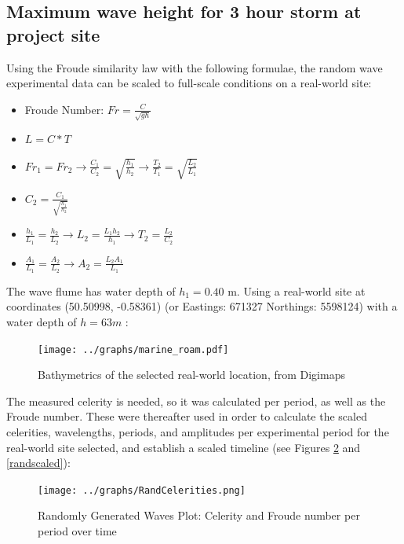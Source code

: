 \documentclass{article}
\begin{document}
	\subsection{Maximum wave height for 3 hour storm at project site}
	Using the Froude similarity law with the following formulae, the random wave experimental data can be scaled to full-scale conditions on a real-world site:
	\begin{itemize}
		\item Froude Number: $Fr = \frac{C}{\sqrt{gh}}$
		\item $L = C * T$
		\item $Fr_1 = Fr_2 \to \frac{C_1}{C_2} = \sqrt{\frac{h_1}{h_2}}\to \frac{T_2}{T_1} = \sqrt{\frac{L_2}{L_1}}$
		\item $C_2 = \frac{C_1}{\sqrt{\frac{h_1}{h_2}}}$
		\item $\frac{h_1}{L_1} = \frac{h_2}{L_2} \to L_2 = \frac{L_1 h_2}{h_1} \to T_2 = \frac{L_2}{C_2}$
		\item $\frac{A_1}{L_1} = \frac{A_2}{L_2} \to A_2 = \frac{L_2 A_1}{L_1}$
	\end{itemize}
	The wave flume has water depth of $h_1 = 0.40$ m. Using a real-world site at coordinates (50.50998, -0.58361) (or Eastings: 671327 Northings: 5598124) with a water depth of $h = 63m$ \cite{digimap}:
	\begin{figure}[H]
		\centering
		\texttt{[image: ../graphs/marine\_roam.pdf]}
		\caption{Bathymetrics of the selected real-world location, from Digimaps \cite{digimap}}
		\label{bathymetrics}
	\end{figure}
	The measured celerity is needed, so it was calculated per period, as well as the Froude number. These were thereafter used in order to calculate the scaled celerities, wavelengths, periods, and amplitudes per experimental period for the real-world site selected, and establish a scaled timeline (see Figures \ref{randcelerity} and \ref{randscaled}):\\
	\begin{figure}[H]
		\centering
		\texttt{[image: ../graphs/RandCelerities.png]}
		\caption{Randomly Generated Waves Plot: Celerity and Froude number per period over time}
		\label{randcelerity}
	\end{figure}
\end{document}
